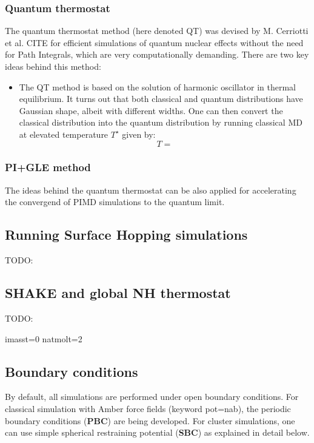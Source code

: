 \subsubsection{Quantum thermostat}
The quantum thermostat method (here denoted QT) was devised by M. Cerriotti et al. CITE for efficient simulations of quantum nuclear effects without the need for Path Integrals, which are very computationally demanding. There are two key ideas behind this method:

\begin{itemize}
\item The QT method is based on the solution of harmonic oscillator in thermal equilibrium. 
It turns out that both classical and quantum distributions have Gaussian shape, albeit with different widths. One can then convert the classical distribution into the quantum distribution
by running classical MD at elevated temperature $T^{\star}$ given by:
\begin{equation}
T =  
\end{equation}
\end{itemize}

\subsubsection{PI+GLE method}
The ideas behind the quantum thermostat can be also applied for accelerating the convergend of PIMD simulations to the quantum limit.  


\subsection{Running Surface Hopping simulations}
TODO:



\subsection{SHAKE and global NH thermostat}
TODO:

\label{sec:shake}

\colorbox{black!20}{imasst=0 } %
\colorbox{black!20}{natmolt=2 } %


\subsection{Boundary conditions}
By default, all simulations are performed under open boundary conditions.
For classical simulation with Amber force fields (keyword pot=nab), the periodic boundary conditions (\textbf{PBC}) are being developed.
For cluster simulations, one can use simple spherical restraining potential (\textbf{SBC}) as explained in detail below. 


